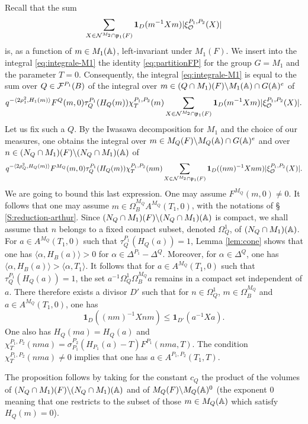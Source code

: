 \begin{paragr}
\begin{preuve}
  Recall that the sum
$$\sum_{X\in \mathcal{N}^{M_2}\cap \mathfrak{p}_1(F)} \mathbf{1}_D(m^{-1}Xm)|\xi_{\mathcal{O}}^{P_1,P_2}(X)|$$
is, as a function of $m\in M_1(\mathbb{A})$, left-invariant under $M_1(F)$. We insert into the integral \eqref{eq:integrale-M1} the identity \eqref{eq:partitionFP} for the group $G=M_1$ and the parameter $T=0$. Consequently, the integral \eqref{eq:integrale-M1} is equal to the sum over $Q\in \mathcal{F}^{P_1}(B)$ of the integral over $m\in (Q\cap M_1)(F)\backslash M_1(\mathbb{A})\cap G(\mathbb{A})^e$ of
$$q^{-\langle 2\rho_1^2,H_1(m)\rangle} F^Q(m,0)\tau_Q^{P_1}(H_Q(m)) \chi_T^{P_1,P_2}(m) \sum_{X\in \mathcal{N}^{M_2}\cap \mathfrak{p}_1(F)} \mathbf{1}_D(m^{-1}Xm)|\xi_{\mathcal{O}}^{P_1,P_2}(X)|.$$
Let us fix such a $Q$. By the Iwasawa decomposition for $M_1$ and the choice of our measures, one obtains the integral over $m\in M_Q(F)\backslash M_Q(\mathbb{A})\cap G(\mathbb{A})^e$ and over $n\in (N_Q\cap M_1)(F)\backslash (N_Q\cap M_1)(\mathbb{A})$ of
$$q^{-\langle 2\rho_Q^2,H_Q(m)\rangle} F^{M_Q}(m,0)\tau_Q^{P_1}(H_Q(m)) \chi_T^{P_1,P_2}(nm) \sum_{X\in \mathcal{N}^{M_2}\cap \mathfrak{p}_1(F)} \mathbf{1}_D((nm)^{-1}Xnm)|\xi_{\mathcal{O}}^{P_1,P_2}(X)|.$$
We are going to bound this last expression. One may assume $F^{M_Q}(m,0)\neq 0$. It follows that one may assume $m\in \Omega_B^{M_Q}A^{M_Q}(T_1,0)$, with the notations of \S\,\ref{S:reduction-arthur}. Since $(N_Q\cap M_1)(F)\backslash (N_Q\cap M_1)(\mathbb{A})$ is compact, we shall assume that $n$ belongs to a fixed compact subset, denoted $\Omega_Q^1$, of $(N_Q\cap M_1)(\mathbb{A})$. For $a\in A^{M_Q}(T_1,0)$ such that $\tau_Q^{P_1}(H_Q(a))=1$, Lemma \ref{lem:cone} shows that one has $\langle \alpha,H_B(a)\rangle >0$ for $\alpha\in \Delta^{P_1}-\Delta^Q$. Moreover, for $\alpha\in \Delta^Q$, one has $\langle \alpha,H_B(a)\rangle > \langle \alpha,T_1\rangle$. It follows that for $a\in A^{M_Q}(T_1,0)$ such that $\tau_Q^{P_1}(H_Q(a))=1$, the set $a^{-1}\Omega_Q^1\Omega_B^{M_Q}a$ remains in a compact set independent of $a$. There therefore exists a divisor $D'$ such that for $n\in \Omega_Q^1$, $m\in \Omega_B^{M_Q}$ and $a\in A^{M_Q}(T_1,0)$, one has
$$\mathbf{1}_D((nm)^{-1}Xnm)\leq \mathbf{1}_{D'}(a^{-1}Xa).$$
One also has $H_Q(ma)=H_Q(a)$ and $\chi_T^{P_1,P_2}(nma)=\sigma_{P_1}^{P_2}(H_{P_1}(a)-T)F^{P_1}(nma,T)$. The condition $\chi_T^{P_1,P_2}(nma)\neq 0$ implies that one has $a\in A^{P_1,P_2}(T_1,T)$.

The proposition follows by taking for the constant $c_Q$ the product of the volumes of $(N_Q\cap M_1)(F)\backslash (N_Q\cap M_1)(\mathbb{A})$ and of $M_Q(F)\backslash M_Q(\mathbb{A})^0$ (the exponent $0$ meaning that one restricts to the subset of those $m\in M_Q(\mathbb{A})$ which satisfy $H_Q(m)=0$).
\end{preuve}
\end{paragr}

